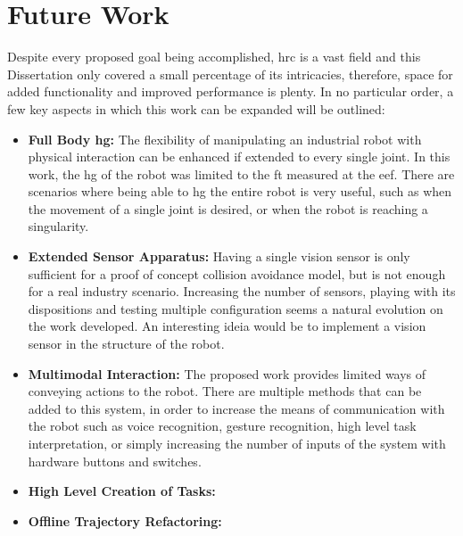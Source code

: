 \section{Future Work}

\par Despite every proposed goal being accomplished, \ac{hrc} is a vast field and this Dissertation only covered a small percentage of its intricacies, therefore, space for added functionality and improved performance is plenty. In no particular order, a few key aspects in which this work can be expanded will be outlined:

\begin{itemize}
    \item \textbf{Full Body \ac{hg}: }The flexibility of manipulating an industrial robot with physical interaction can be enhanced if extended to every single joint. In this work, the \ac{hg} of the robot was limited to the \ac{ft} measured at the \ac{eef}. There are scenarios where being able to \ac{hg} the entire robot is very useful, such as when the movement of a single joint is desired, or when the robot is reaching a singularity.
    \item \textbf{Extended Sensor Apparatus: }Having a single vision sensor is only sufficient for a proof of concept collision avoidance model, but is not enough for a real industry scenario. Increasing the number of sensors, playing with its dispositions and testing multiple configuration seems a natural evolution on the work developed. An interesting ideia would be to implement a vision sensor in the structure of the robot.
    \item \textbf{Multimodal Interaction: }The proposed work provides limited ways of conveying actions to the robot. There are multiple methods that can be added to this system, in order to increase the means of communication with the robot such as voice recognition, gesture recognition, high level task interpretation, or simply increasing the number of inputs of the system with hardware buttons and switches.
    \item \textbf{High Level Creation of Tasks: }
    \item \textbf{Offline Trajectory Refactoring: }
\end{itemize}


